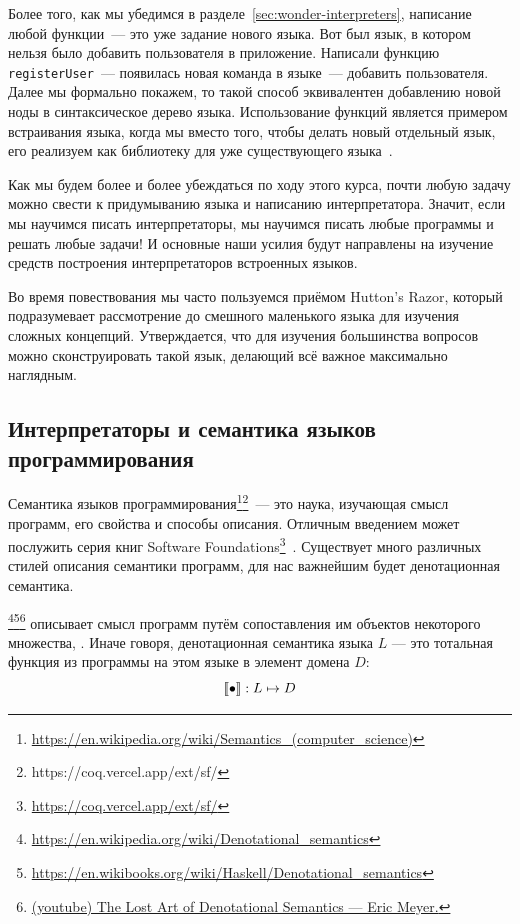 Более того, как мы убедимся в разделе~\ref{sec:wonder-interpreters}, написание любой функции~--- это уже задание нового языка.
Вот был язык, в котором нельзя было добавить пользователя в приложение.
Написали функцию \texttt{registerUser}~--- появилась новая команда в языке~--- добавить пользователя.
Далее мы формально покажем, то такой способ эквивалентен добавлению новой ноды в синтаксическое дерево языка. %
Использование функций является примером встраивания языка, когда мы вместо того, чтобы делать новый отдельный язык, его реализуем как библиотеку для уже существующего языка~\cite{gibbons2013functional}.

Как мы будем более и более убеждаться по ходу этого курса, почти любую задачу можно свести к придумыванию языка и написанию интерпретатора.
Значит, если мы научимся писать интерпретаторы, мы научимся писать любые программы и решать любые задачи!
И основные наши усилия будут направлены на изучение средств построения интерпретаторов встроенных языков.

Во время повествования мы часто пользуемся приёмом Hutton's Razor, который подразумевает рассмотрение до смешного маленького языка для изучения сложных концепций.
Утверждается, что для изучения большинства вопросов можно сконструировать такой язык, делающий всё важное максимально наглядным.

\subsection{Интерпретаторы и семантика языков программирования} \label{subsec:semantics}

Семантика языков программирования\footnote{\url{https://en.wikipedia.org/wiki/Semantics_(computer_science)}\label{note:sema-wiki}}\footnote{https://coq.vercel.app/ext/sf/}~--- это наука, изучающая смысл программ, его свойства и способы описания.
Отличным введением может послужить серия книг Software Foundations\footnote{\url{https://coq.vercel.app/ext/sf/}}~\cite{pierce2010software}.
Существует много различных стилей описания семантики программ, для нас важнейшим будет денотационная семантика.

\footnote{\url{https://en.wikipedia.org/wiki/Denotational_semantics}}\footnote{\url{https://en.wikibooks.org/wiki/Haskell/Denotational_semantics}}\footnote{\href{https://youtu.be/pQyH0p-XJzE?si=TUEzrpHhJZfO7dTF}{(youtube) The Lost Art of Denotational Semantics --- Eric Meyer.}} описывает смысл программ путём сопоставления им объектов некоторого множества, .
Иначе говоря, денотационная семантика языка $L$ --- это тотальная функция из программы на этом языке в элемент домена $D$:
\[
    \llbracket{\bullet}\rrbracket : L \mapsto D
\]


